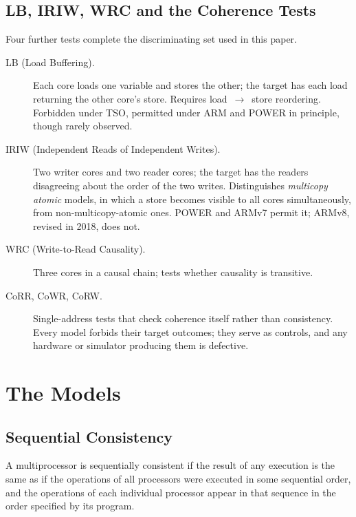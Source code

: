 \subsection{LB, IRIW, WRC and the Coherence Tests}

Four further tests complete the discriminating set used in this paper.

\begin{description}
\item[LB (Load Buffering).] Each core loads one variable and stores the other;
  the target has each load returning the other core's store.
Requires
  load~$\to$~store reordering.
Forbidden under TSO, permitted under ARM and POWER
  in principle, though rarely observed.
\item[IRIW (Independent Reads of Independent Writes).] Two writer cores and two
  reader cores; the target has the readers disagreeing about the order of the two
  writes.
Distinguishes \emph{multicopy atomic} models, in which a store becomes
  visible to all cores simultaneously, from non-multicopy-atomic ones.
POWER and
  ARMv7 permit it; ARMv8, revised in 2018, does not.
\item[WRC (Write-to-Read Causality).] Three cores in a causal chain; tests
  whether causality is transitive.
\item[CoRR, CoWR, CoRW.] Single-address tests that check coherence itself rather
  than consistency.
Every model forbids their target outcomes; they serve as
  controls, and any hardware or simulator producing them is defective.
\end{description}

\section{The Models}
\label{sec:the-models}

\subsection{Sequential Consistency}

\begin{definition}
A multiprocessor is sequentially consistent if the result of any execution is the
same as if the operations of all processors were executed in some sequential
order, and the operations of each individual processor appear in that sequence in
the order specified by its program.
\end{definition}

